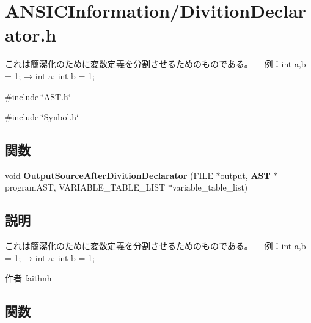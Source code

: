 \section{ANSICInformation/DivitionDeclarator.h}
\label{DivitionDeclarator_8h}


これは簡潔化のために変数定義を分割させるためのものである。 　例：int a,b = 1; → int a; int b = 1;  


{\ttfamily \#include \char`\"{}AST.h\char`\"{}}\par
{\ttfamily \#include \char`\"{}Synbol.h\char`\"{}}\par
\subsection*{関数}
\begin{DoxyCompactItemize}
\item 
void {\bf OutputSourceAfterDivitionDeclarator} (FILE $\ast$output, {\bf AST} $\ast$programAST, VARIABLE\_\-TABLE\_\-LIST $\ast$variable\_\-table\_\-list)
\end{DoxyCompactItemize}


\subsection{説明}
これは簡潔化のために変数定義を分割させるためのものである。 　例：int a,b = 1; → int a; int b = 1; \begin{DoxyAuthor}{作者}
faithnh 
\end{DoxyAuthor}


\subsection{関数}
